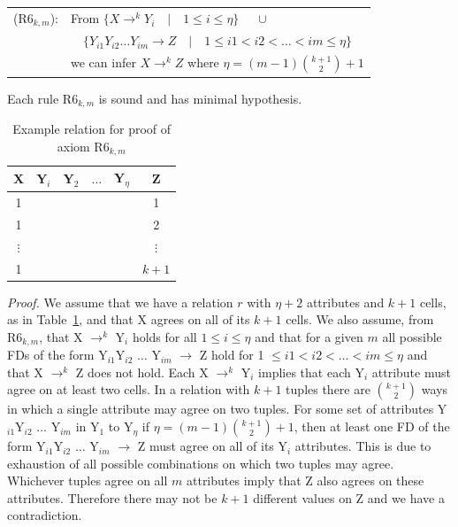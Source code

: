 \smallskip
{\line
\begin{table}[ht]
\begin{tabular}{cl} \\
(R6$_{k,m}$): 	& From  $\{ X \to^{k} Y_i \quad |  \quad 1 \le i \le
		\eta \}$    $\quad \cup$ \\
		&    $\quad \{ Y_{i1}Y_{i2} \ldots Y_{im} \to Z
		\quad |  \quad 1 \le i1 < i2 < \ldots < im \le \eta \}$ \\ 
\rule{0cm}{5mm} & we can infer $X \to^{k} Z$ where $\eta =
		(m-1){k+1 \choose 2} + 1$  \\
\end{tabular}
\end{table}}
\smallskip

\begin{theorem}\label{th:1}
\begin{rm}
Each rule R6$_{k,m}$ is sound and has minimal hypothesis.
\end{rm}
\end{theorem}

{\line
\begin{table}[ht]
\begin{center}
\begin{tabular}{|c|c|c|c|c|c|} \hline
X	&	Y$_i$	&	Y$_2$	& $\ldots$ & Y$_{\eta}$	 & Z \\\hline
1	&		&		&          &	       & 1 \\
1	&		&		&          &	       & 2 \\	
$\vdots$ &		&		&          &	       & $\vdots$ \\
1	&		&		&          &	       & $k+1$\\ \hline
\end{tabular}
\end{center}
\caption{\label{tbl:axiom_r6km} Example relation for proof of axiom R6$_{k,m}$}
\end{table}}	


{\em Proof.} We assume that we have a relation $r$ with $\eta + 2$
attributes and $k+1$ cells, as in Table~\ref{tbl:axiom_r6km}, and that
X agrees on all of its $k+1$ cells.  We also assume, from 
R6$_{k,m}$, that X $\to^k$ Y$_i$ holds for all $1 \le i \le \eta$ and
that for a given $m$ all possible FDs of the form \linebreak Y$_{i1}$Y$_{i2}$ $\ldots$
Y$_{im}$ $\to$ Z hold for 1 $\le i1 < i2 < \ldots < im \le \eta$ and
that X $\to^k$ Z does not hold.
Each X $\to^k$ Y$_i$ implies that each Y$_i$ attribute must agree on
at least two cells. In a relation with $k + 1$ tuples there are 
${k+1 \choose 2}$ ways in which a single
attribute may agree on two tuples. For some set of attributes
Y$_{i1}$Y$_{i2}$ $\ldots$ Y$_{im}$ 
in Y$_1$ to Y$_{\eta}$ if $\eta = (m-1){k+1 \choose 2} + 1$, then at
least one FD of the form \linebreak Y$_{i1}$Y$_{i2}$ $\ldots$
Y$_{im}$ $\to$ Z must agree on all of its Y$_i$ attributes. This is due to
exhaustion of all possible combinations on which two tuples may agree.
Whichever tuples agree on all $m$ attributes imply that Z also agrees
on these attributes. Therefore there may not be $k+1$
different values on Z and we have a contradiction. 
\medskip

